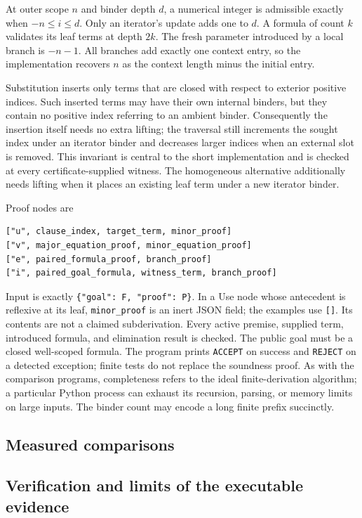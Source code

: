 \documentclass[11pt]{article}
\theoremstyle{definition}\newtheorem{definition}[theorem]{Definition}
\theoremstyle{remark}\newtheorem{remark}[theorem]{Remark}
\newcommand{\code}[1]{\texttt{#1}}
\begin{document}
At outer scope $n$ and binder depth $d$, a numerical integer is admissible
exactly when $-n\le i\le d$. Only an iterator's update adds one to $d$.
A formula of count $k$ validates its leaf terms at depth $2k$.
The fresh parameter introduced by a local branch is $-n-1$.
All branches add exactly one context entry, so the implementation recovers
$n$ as the context length minus the initial entry.

Substitution inserts only terms that are closed with respect to exterior
positive indices. Such inserted terms may have their own internal
binders, but they contain no positive index referring to an ambient binder.
Consequently the insertion itself needs no extra lifting; the traversal
still increments the sought index under an iterator binder and decreases
larger indices when an external slot is removed. This invariant is central
to the short implementation and is checked at every certificate-supplied
witness. The homogeneous alternative additionally needs lifting when it
places an existing leaf term under a new iterator binder.

Proof nodes are
\begin{lstlisting}
["u", clause_index, target_term, minor_proof]
["v", major_equation_proof, minor_equation_proof]
["e", paired_formula_proof, branch_proof]
["i", paired_goal_formula, witness_term, branch_proof]
\end{lstlisting}
Input is exactly \code{\{"goal": F, "proof": P\}}. In a Use node whose
antecedent is reflexive at its leaf, \code{minor\_proof} is an inert JSON
field; the examples use \code{[]}. Its contents are not a claimed
subderivation. Every active premise, supplied term, introduced formula,
and elimination result is checked. The public goal must be a closed
well-scoped formula. The program prints \code{ACCEPT} on success and
\code{REJECT} on a detected exception; finite tests do not replace the
soundness proof. As with the comparison programs, completeness refers
to the ideal finite-derivation algorithm; a particular Python process
can exhaust its recursion, parsing, or memory limits on large inputs.
The binder count may encode a long finite prefix succinctly.

\subsection{Measured comparisons}



\subsection{Verification and limits of the executable evidence}
\end{document}

